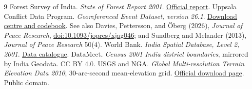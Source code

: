 \documentclass[11pt,a4paper]{article}
\begin{document}
\begin{thebibliography}{9}
 Forest Survey of India. \emph{State of Forest Report 2001}. \href{https://fsi.nic.in/documents/sfr_2001_hindi.pdf}{Official report}.
 Uppsala Conflict Data Program. \emph{Georeferenced Event Dataset, version 26.1}. \href{https://ucdp.uu.se/downloads/}{Download centre and codebook}. See also Davies, Pettersson, and \"Oberg (2026), \emph{Journal of Peace Research}, \href{https://doi.org/10.1093/jopres/xjag046}{doi:10.1093/jopres/xjag046}; and Sundberg and Melander (2013), \emph{Journal of Peace Research} 50(4).
 World Bank. \emph{India Spatial Database, Level 2, 2001}. \href{https://datacatalog.worldbank.org/search/dataset/0062657/india-spatial-database}{Data catalogue}.
 DataMeet. \emph{Census 2001 India district boundaries}, mirrored by \href{https://github.com/yashveeeeeeer/india-geodata/tree/main/data/administrative/districts/census-2001}{India Geodata}. CC BY 4.0.
 USGS and NGA. \emph{Global Multi-resolution Terrain Elevation Data 2010}, 30-arc-second mean-elevation grid. \href{https://topotools.cr.usgs.gov/gmted_viewer/gmted2010_global_grids.php}{Official download page}. Public domain.
\end{thebibliography}
\end{document}

